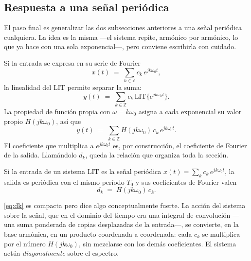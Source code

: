 \documentclass[class=book, crop=false]{standalone}
\begin{document}
\subsection{Respuesta a una señal periódica}
\label{subsec:respuesta_periodica}

El paso final es generalizar las dos subsecciones anteriores a una señal periódica cualquiera. La idea es la misma ---el sistema repite, armónico por armónico, lo que ya hace con una sola exponencial---, pero conviene escribirla con cuidado.

Si la entrada se expresa en su serie de Fourier
\begin{equation*}
    x(t) \;=\; \sum_{k\in\mathbb{Z}} c_k\,e^{jk\omega_0 t},
\end{equation*}
la linealidad del LIT permite separar la suma:
\begin{equation*}
    y(t) \;=\; \sum_{k\in\mathbb{Z}} c_k\,\text{LIT}\bigl\{e^{jk\omega_0 t}\bigr\}.
\end{equation*}
La propiedad de función propia con $\omega = k\omega_0$ asigna a cada exponencial su valor propio $H(jk\omega_0)$, así que
\begin{equation*}
    y(t) \;=\; \sum_{k\in\mathbb{Z}} H(jk\omega_0)\,c_k\,e^{jk\omega_0 t}.
\end{equation*}
El coeficiente que multiplica a $e^{jk\omega_0 t}$ es, por construcción, el coeficiente de Fourier de la salida. Llamándolo $d_k$, queda la relación que organiza toda la sección.

\begin{resultado}
Si la entrada de un sistema LIT es la señal periódica
$x(t) = \sum_k c_k\,e^{jk\omega_0 t}$, la salida es periódica con el mismo período $T_0$ y sus coeficientes de Fourier valen
\begin{equation}
    d_k \;=\; H(jk\omega_0)\,c_k.
    \label{eq:dk}
\end{equation}
\end{resultado}

\eqref{eq:dk} es compacta pero dice algo conceptualmente fuerte. La acción del sistema sobre la señal, que en el dominio del tiempo era una integral de convolución ---una suma ponderada de copias desplazadas de la entrada---, se convierte, en la base armónica, en un producto coordenada a coordenada: cada $c_k$ se multiplica por el número $H(jk\omega_0)$, sin mezclarse con los demás coeficientes. El sistema actúa \emph{diagonalmente} sobre el espectro.
\end{document}

